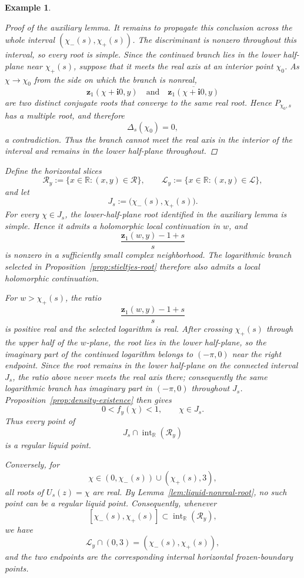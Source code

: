 \documentclass[11pt]{amsart}
\theoremstyle{plain}
\newtheorem{example}[theorem]{Example}
\numberwithin{equation}{section}
\numberwithin{theorem}{section}
\numberwithin{figure}{section}
\begin{document}
\begin{example}
\begin{proof}[Proof of the auxiliary lemma]
It remains to propagate this conclusion across the whole interval
$(\chi_-(s),\chi_+(s))$. The discriminant is nonzero throughout this
interval, so every root is simple. Since the
continued branch lies in the lower half-plane near \(\chi_+(s)\),
suppose that it meets the real axis at an interior point
\(\chi_0\).  As \(\chi\to\chi_0\) from the side on which the branch is
nonreal,
\[
    \mathbf z_1(\chi+\mathbf i0,y)
    \quad\text{and}\quad
    \overline{\mathbf z_1(\chi+\mathbf i0,y)}
\]
are two distinct conjugate roots that converge to the same real root.
Hence \(P_{\chi_0,s}\) has a multiple root, and therefore
\[
    \Delta_s(\chi_0)=0,
\]
a contradiction.  Thus the branch cannot meet the real axis in the
interior of the interval and remains in the lower half-plane
throughout.
\end{proof}

Define the horizontal slices
\[
    \mathcal R_y
    :=
    \{x\in\mathbb R:(x,y)\in\mathcal R\},
    \qquad
    \mathcal L_y
    :=
    \{x\in\mathbb R:(x,y)\in\mathcal L\},
\]
and let
\[
    J_s:=\bigl(\chi_-(s),\chi_+(s)\bigr).
\]
For every $\chi\in J_s$, the lower-half-plane root identified in the
auxiliary lemma is simple. Hence it admits a holomorphic local
continuation in $w$, and
\[
    \frac{\mathbf z_1(w,y)-1+s}{s}
\]
is nonzero in a sufficiently small complex neighborhood. The
logarithmic branch selected in
Proposition~\ref{prop:stieltjes-root} therefore also admits a local
holomorphic continuation.

For $w>\chi_+(s)$, the ratio
\[
    \frac{\mathbf z_1(w,y)-1+s}{s}
\]
is positive real and the selected logarithm is real. After crossing
$\chi_+(s)$ through the upper half of the $w$-plane, the root lies in
the lower half-plane, so the imaginary part of the continued logarithm
belongs to $(-\pi,0)$ near the right endpoint. Since the root remains
in the lower half-plane on the connected interval $J_s$, the ratio
above never meets the real axis there; consequently the same
logarithmic branch has imaginary part in $(-\pi,0)$ throughout $J_s$.
Proposition~\ref{prop:density-existence} then gives
\[
    0<f_y(\chi)<1,
    \qquad \chi\in J_s.
\]
Thus every point of
\[
    J_s\cap\operatorname{int}_{\mathbb R}(\mathcal R_y)
\]
is a regular liquid point.

Conversely, for
\[
    \chi\in(0,\chi_-(s))\cup(\chi_+(s),3),
\]
all roots of $U_s(z)=\chi$ are real. By
Lemma~\ref{lem:liquid-nonreal-root}, no such point can be a regular
liquid point. Consequently, whenever
\[
    [\chi_-(s),\chi_+(s)]
    \subset
    \operatorname{int}_{\mathbb R}(\mathcal R_y),
\]
we have
\[
    \mathcal L_y\cap(0,3)
    =
    (\chi_-(s),\chi_+(s)),
\]
and the two endpoints are the corresponding internal horizontal
frozen-boundary points.


\end{example}
\end{document}
